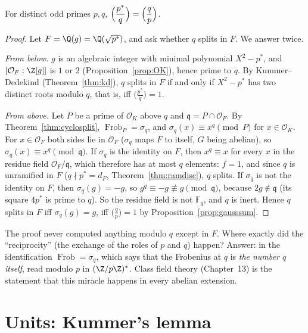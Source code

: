 \begin{theorem}\label{thm:qrfrob}
For distinct odd primes $p,q$, $\displaystyle\Bigl(\frac{p^*}q\Bigr)=\Bigl(\frac qp\Bigr)$.
\end{theorem}
\begin{proof}
Let $F=\Q(g)=\Q(\sqrt{p^*})$, and ask whether $q$ splits in $F$. We answer twice.

\emph{From below.} $g$ is an algebraic integer with minimal polynomial $X^2-p^*$, and $[\mathcal O_F:\Z[g]]$ is $1$ or $2$
(Proposition~\ref{prop:OK}), hence prime to $q$. By Kummer--Dedekind (Theorem~\ref{thm:kd}), $q$ splits in $F$ if and only if
$X^2-p^*$ has two distinct roots modulo $q$, that is, iff $\bigl(\frac{p^*}q\bigr)=1$.

\emph{From above.} Let $P$ be a prime of $\mathcal O_K$ above $q$ and $\mathfrak q=P\cap\mathcal O_F$. By
Theorem~\ref{thm:cyclosplit}, $\operatorname{Frob}_P=\sigma_q$, and $\sigma_q(x)\equiv x^q\pmod P$ for $x\in\mathcal O_K$.
For $x\in\mathcal O_F$ both sides lie in $\mathcal O_F$ ($\sigma_q$ maps $F$ to itself, $G$ being abelian), so
$\sigma_q(x)\equiv x^q\pmod{\mathfrak q}$. If $\sigma_q$ is the identity on $F$, then $x^q\equiv x$ for every $x$ in the
residue field $\mathcal O_F/\mathfrak q$, which therefore has at most $q$ elements: $f=1$, and since $q$ is unramified in $F$
($q\nmid p^*=d_F$, Theorem~\ref{thm:ramdisc}), $q$ splits. If $\sigma_q$ is not the identity on $F$, then $\sigma_q(g)=-g$,
so $g^q\equiv-g\not\equiv g\pmod{\mathfrak q}$, because $2g\notin\mathfrak q$ (its square $4p^*$ is prime to $q$). So the
residue field is not $\mathbb F_q$, and $q$ is inert. Hence $q$ splits in $F$ iff $\sigma_q(g)=g$, iff $\bigl(\frac qp\bigr)=1$ by
Proposition~\ref{prop:gausssum}.
\end{proof}

\begin{think}
The proof never computed anything modulo $q$ except in $F$. Where exactly did the ``reciprocity'' (the exchange of the roles
of $p$ and $q$) happen? Answer: in the identification $\operatorname{Frob}=\sigma_q$, which says that the Frobenius at $q$
is \emph{the number $q$ itself}, read modulo $p$ in $(\Z/p\Z)^*$. Class field theory (Chapter~13) is the statement that this
miracle happens in every abelian extension.
\end{think}

\section{Units: Kummer's lemma}

